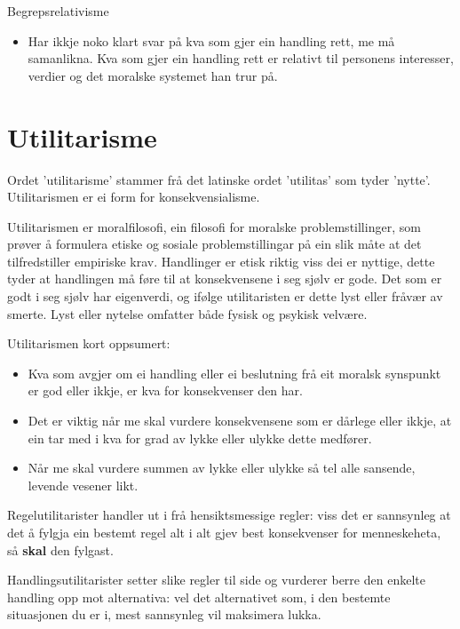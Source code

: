 \documentclass[a4paper]{IEEEtran}
\begin{document}
Begrepsrelativisme\bigskip
\begin{itemize}
    \item Har ikkje noko klart svar på kva som gjer ein handling rett, me må samanlikna. Kva som gjer ein handling rett er relativt til personens interesser, verdier og det moralske systemet han trur på.
\end{itemize}

\bigskip
\section{Utilitarisme}
\label{utilitarisme}\bigskip

Ordet 'utilitarisme' stammer frå det latinske ordet 'utilitas' som tyder 'nytte'. Utilitarismen er ei form for konsekvensialisme.\bigskip


Utilitarismen er moralfilosofi, ein filosofi for moralske problemstillinger, som prøver å formulera etiske og sosiale problemstillingar på ein slik måte at det tilfredstiller empiriske krav. Handlinger er etisk riktig viss dei er nyttige, dette tyder at handlingen må føre til at konsekvensene i seg sjølv er gode. Det som er godt i seg sjølv har eigenverdi, og ifølge utilitaristen er dette lyst eller fråvær av smerte. Lyst eller nytelse omfatter både fysisk og psykisk velvære.\bigskip
 


Utilitarismen kort oppsumert:\bigskip
\begin{itemize}
    \item Kva som avgjer om ei handling eller ei beslutning frå eit moralsk synspunkt er god eller ikkje, er kva for konsekvenser den har.
    \item Det er viktig når me skal vurdere konsekvensene som er dårlege eller ikkje, at ein tar med i kva for grad av lykke eller ulykke dette medfører.
    \item Når me skal vurdere summen av lykke eller ulykke så tel alle sansende, levende vesener likt. 
\end{itemize}\bigskip

Regelutilitarister handler ut i frå hensiktsmessige regler: viss det er sannsynleg at det å fylgja ein bestemt regel alt i alt gjev best konsekvenser for menneskeheta, så \textbf{skal} den fylgast.\bigskip

Handlingsutilitarister setter slike regler til side og vurderer berre den enkelte handling opp mot alternativa: vel det alternativet som, i den bestemte situasjonen du er i, mest sannsynleg vil maksimera lukka.
\end{document}
